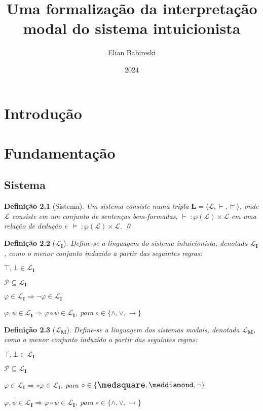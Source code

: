 \documentclass{report}
\newtheorem{definition}{Definição}
\begin{document}
    \title{Uma formalização da interpretação modal do sistema intuicionista}
    \author{Elian Babireski}
    \date{2024}

    \maketitle

    \chapter{Introdução}
    \chapter{Fundamentação}

    \section{Sistema}

    \begin{definition}[Sistema]
        Um sistema consiste numa tripla $\mathbf{L} = \langle \mathcal{L}, \vdash, \vDash\rangle$, onde $\mathcal{L}$ consiste em um conjunto de sentenças bem-formadas, $\vdash \: : \wp(\mathcal{L}) \times \mathcal{L} $ em uma relação de dedução e $\, \vDash \: : \wp(\mathcal{L}) \times \mathcal{L}$.
        \qed
    \end{definition}

    \begin{definition}[$\mathcal{L}_\mathbf{I}$]
        Define-se a linguagem do sistema intuicionista, denotada $\mathcal{L}_\mathbf{I}$, como o menor conjunto induzido a partir das seguintes regras:
        
        $\top, \bot \in \mathcal{L}_\mathbf{I}$
        
        $\mathcal{P} \subseteq \mathcal{L}_\mathbf{I}$
        
        $\varphi \in \mathcal{L}_\mathbf{I} \Rightarrow \neg \varphi \in \mathcal{L}_\mathbf{I}$

        $\varphi, \psi \in \mathcal{L}_\mathbf{I} \Rightarrow \varphi \circ \psi \in \mathcal{L}_\mathbf{I}$, para $\circ \in \{\wedge, \vee, \to\}$
    \end{definition}

    \begin{definition}[$\mathcal{L}_\mathbf{M}$]
        Define-se a linguagem dos sistemas modais, denotada $\mathcal{L}_\mathbf{M}$, como o menor conjunto induzido a partir das seguintes regras:
        
        $\top, \bot \in \mathcal{L}_\mathbf{I}$
        
        $\mathcal{P} \subseteq \mathcal{L}_\mathbf{I}$
        
        $\varphi \in \mathcal{L}_\mathbf{I} \Rightarrow \circ \varphi \in \mathcal{L}_\mathbf{I}$, para $\circ \in \{\nec, \pos, \neg\}$

        $\varphi, \psi \in \mathcal{L}_\mathbf{I} \Rightarrow \varphi \circ \psi \in \mathcal{L}_\mathbf{I}$, para $\circ \in \{\wedge, \vee, \to\}$
    \end{definition}
\end{document}
